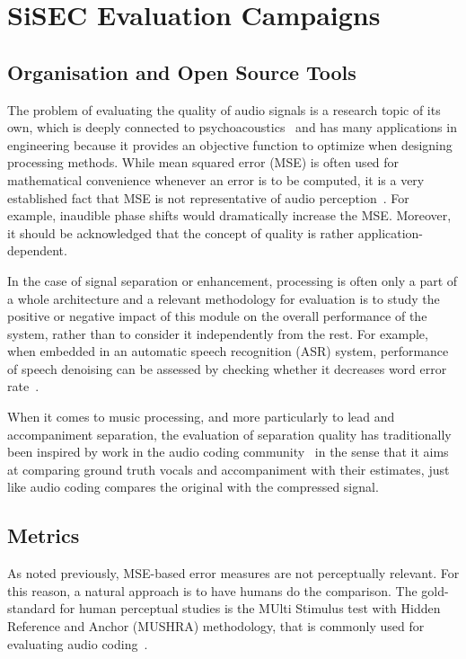 \section{SiSEC Evaluation Campaigns}
\label{sec:evaluation}

\subsection{Organisation and Open Source Tools}
\label{ssec:background}

The problem of evaluating the quality of audio signals is a research topic of its own, which is deeply connected to psychoacoustics~\cite{zwicker13} and has many applications in engineering because it provides an objective function to optimize when designing processing methods. While mean squared error (MSE) is often used for mathematical convenience whenever an error is to be computed, it is a very established fact that MSE is not representative of audio perception~\cite{rix01,wang09}. For example, inaudible phase shifts would dramatically increase the MSE. Moreover, it should be acknowledged  that the concept of quality is rather application-dependent.

In the case of signal separation or enhancement, processing is often only a part of a whole architecture and a relevant methodology for evaluation is to study the positive or negative impact of this module on the overall performance of the system, rather than to consider it independently from the rest. For example, when embedded in an automatic speech recognition (ASR) system, performance of speech denoising can be assessed by checking whether it decreases word error rate~\cite{barker15}.

When it comes to music processing, and more particularly to lead and accompaniment separation, the evaluation of separation quality has traditionally been inspired by work in the audio coding community~\cite{recommendation2001MUSHRA,rix01} in the sense that it aims at comparing ground truth vocals and accompaniment with their estimates, just like audio coding compares the original with the compressed signal.

\subsection{Metrics}
\label{ssec:metrics}

As noted previously, MSE-based error measures are not perceptually relevant. For this reason, a natural approach is to have humans do the comparison. The gold-standard for human perceptual studies is the MUlti Stimulus test with Hidden Reference and Anchor (MUSHRA) methodology, that is commonly used for evaluating audio coding~\cite{recommendation2001MUSHRA}.

